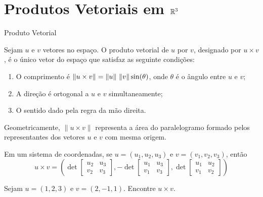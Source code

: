 \section{Produtos Vetoriais em $\mathbb{R}^3$}

\begin{frame}[label=produtovetorial]{Produto Vetorial}

\begin{defin}
Sejam ${u}$ e ${v}$ vetores no espaço. O {\color{blue} produto vetorial} de ${u}$ por ${v}$, designado por ${u}\times {v}$, é o único vetor do espaço que satisfaz as seguinte condições:
\begin{enumerate}
	\item O {\color{blue} comprimento} é $\|u\times v\|=\|{u}\|\ \|{v}\| \sin (\theta)$, onde $\theta$ é o ângulo entre $u$ e $v$;
	\item A {\color{blue} direção} é ortogonal a  ${u}$ e ${v}$ simultaneamente;
	\item O {\color{blue}sentido} dado pela regra da mão direita.
\end{enumerate}

Geometricamente, $\|u\times v\|$ representa a área do paralelogramo formado pelos representantes dos vetores $u$ e $v$ com mesma origem.
\end{defin}


\end{frame}



\begin{frame}[label=produtovetorial]{}
	
\begin{prop}
	Em um sistema de coordenadas, se $u=(u_1,u_2,u_3)$ e $v=(v_1,v_2,v_3)$, então 
	\[u\times v= 
	\left(
	\det \begin{bmatrix}
		u_2 & u_3\\
		v_2 & v_3
	\end{bmatrix},
	-\det \begin{bmatrix}
		u_1 & u_3\\
		v_1 & v_3
	\end{bmatrix},
	\det \begin{bmatrix}
		u_1 & u_2\\
		v_1 & v_2
	\end{bmatrix}
	\right)\]
\end{prop}
	
\begin{exe}
 Sejam $u=(1,2,3)$ e $v=(2,-1,1)$. Encontre $u\times v$.

\end{exe}

\end{frame}



